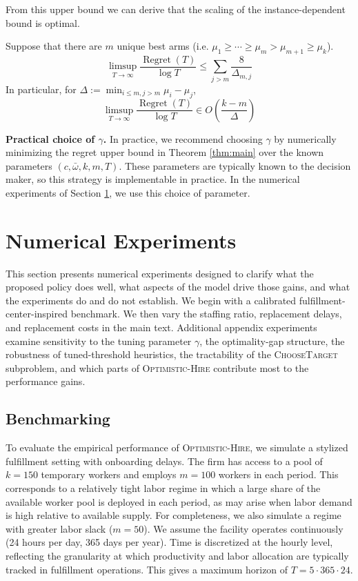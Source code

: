 \documentclass[opre,blindrev]{informs3}
\newcommand{\ChooseTarget}{\textsc{ChooseTarget}\,}
\newcommand{\Regret}{\operatorname{Regret}}
\begin{document}
From this upper bound we can derive that the scaling of the instance-dependent bound is optimal.
\begin{corollary}
    Suppose that there are \(m\) unique best arms (i.e. \(\mu_1\geq \cdots \geq \mu_m >\mu_{m+1}\geq \mu_k\)).
    \[\limsup_{T\to\infty}\frac{\Regret(T)}{\log T}\leq \sum_{j>m}\frac{8}{\Delta_{m,j}}\]
    In particular, for \(\Delta:=\min_{i\leq m,j>m}\mu_i-\mu_j\),
    \[\limsup_{T\to\infty}\frac{\Regret(T)}{\log T}\in O\!\left(\frac{k-m}{\Delta}\right)\]
\end{corollary}

{\bf Practical choice of \(\gamma\).}
In practice, we recommend choosing \(\gamma\) by numerically minimizing the regret upper bound in Theorem \ref{thm:main} over the known parameters \((c, \bar{\omega}, k, m, T)\). These parameters are typically known to the decision maker, so this strategy is implementable in practice. In the numerical experiments of Section \ref{numerical}, we use this choice of parameter.



\section{Numerical Experiments}
\label{numerical}
This section presents numerical experiments designed to clarify what the proposed policy does well, what aspects of the model drive those gains, and what the experiments do and do not establish. We begin with a calibrated fulfillment-center-inspired benchmark. We then vary the staffing ratio, replacement delays, and replacement costs in the main text. Additional appendix experiments examine sensitivity to the tuning parameter \(\gamma\), the optimality-gap structure, the robustness of tuned-threshold heuristics, the tractability of the \ChooseTarget subproblem, and which parts of \textsc{Optimistic-Hire} contribute most to the performance gains.

\vspace{-.1in}

\subsection{Benchmarking}\label{numerical:benchmarks}
To evaluate the empirical performance of \textsc{Optimistic-Hire}, we simulate a stylized fulfillment setting with onboarding delays. The firm has access to a pool of \(k=150\) temporary workers and employs \(m=100\) workers in each period. This corresponds to a relatively tight labor regime in which a large share of the available worker pool is deployed in each period, as may arise when labor demand is high relative to available supply. For completeness, we also simulate a regime with greater labor slack (\(m=50\)). We assume the facility operates continuously (24 hours per day, 365 days per year). Time is discretized at the hourly level, reflecting the granularity at which productivity and labor allocation are typically tracked in fulfillment operations. This gives a maximum horizon of \(T=5 \cdot 365 \cdot 24\). 
\end{document}
